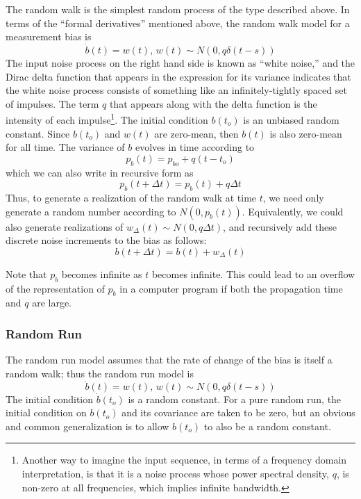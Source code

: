 The random walk is the simplest random process of the type described above.  In terms of the ``formal derivatives'' mentioned above, the random walk model for a measurement bias is
\begin{equation}
	\dot{b}(t) = w(t), \, w(t) \sim N(0, q\delta(t-s))
\end{equation}
The input noise process on the right hand side is known as ``white noise,'' and the Dirac delta function that appears in the expression for its variance indicates that the white noise process consists of something like an infinitely-tightly spaced set of impulses.  The term $q$ that appears along with the delta function is the intensity of each impulse\footnote{Another way to imagine the input sequence, in terms of a frequency domain interpretation, is that it is a noise process whose power spectral density, $q$, is non-zero at all frequencies, which implies infinite bandwidth.}.  The initial condition $b(t_o)$ is an unbiased random constant.  Since $b(t_o)$ and $w(t)$ are zero-mean, then $b(t)$ is also zero-mean for all time.  The variance of $b$ evolves in time according to
\begin{equation}
	p_b(t) = p_{bo} + q (t-t_o)
\end{equation}
which we can also write in recursive form as
\begin{equation}
	p_b(t+\Delta t) = p_b(t) + q\Delta t
\end{equation}
Thus, to generate a realization of the random walk at time $t$, we need only generate a random number according to $N(0, p_b(t))$.  Equivalently, we could also generate realizations of $w_\Delta(t) \sim N(0, q\Delta t)$, and recursively add these discrete noise increments to the bias as follows:
\begin{equation}
	 b(t+\Delta t) = b(t) + w_\Delta(t)
\end{equation}

Note that $p_b$ becomes infinite as $t$ becomes infinite.  This could lead to an overflow of the representation of $p_b$ in a computer program if both the propagation time and $q$ are large.

\subsubsection{Random Run}

The random run model assumes that the rate of change of the bias is itself a random walk; thus the random run model is
\begin{equation}
	\ddot{b}(t) = w(t), \, w(t) \sim N(0, q\delta(t-s))
\end{equation}
The initial condition $\dot{b}(t_o)$ is a random constant.  For a pure random run, the initial condition on $b(t_o)$ and its covariance are taken to be zero, but an obvious and common generalization is to allow $b(t_o)$ to also be a random constant.

